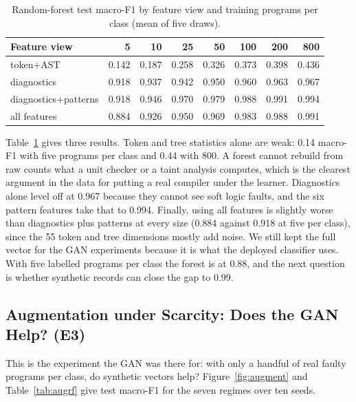 \documentclass[12pt,a4paper]{article}
\begin{document}
\begin{table}[!htbp]
\centering
\caption{Random-forest test macro-F1 by feature view and training programs per class (mean of five draws).}
\label{tab:learning}
\small
\begin{tabular}{lrrrrrrr}
\toprule
\textbf{Feature view} & \textbf{5} & \textbf{10} & \textbf{25} & \textbf{50} & \textbf{100} & \textbf{200} & \textbf{800}\\
\midrule
token+AST & 0.142 & 0.187 & 0.258 & 0.326 & 0.373 & 0.398 & 0.436\\
diagnostics & 0.918 & 0.937 & 0.942 & 0.950 & 0.960 & 0.963 & 0.967\\
diagnostics+patterns & 0.918 & 0.946 & 0.970 & 0.979 & 0.988 & 0.991 & 0.994\\
all features & 0.884 & 0.926 & 0.950 & 0.969 & 0.983 & 0.988 & 0.991\\\bottomrule
\end{tabular}

\end{table}

Table~\ref{tab:learning} gives three results. Token and tree statistics alone are weak: 0.14 macro-F1 with five programs
per class and 0.44 with 800. A forest cannot rebuild from raw counts what a unit checker or a taint analysis computes,
which is the clearest argument in the data for putting a real compiler under the learner. Diagnostics alone level off
at 0.967 because they cannot see soft logic faults, and the six pattern features take that to 0.994. Finally, using all
features is slightly worse than diagnostics plus patterns at every size (0.884 against 0.918 at five per class), since
the 55 token and tree dimensions mostly add noise. We still kept the full vector for the GAN experiments because it is
what the deployed classifier uses. With five labelled programs per class the forest is at 0.88, and the next question
is whether synthetic records can close the gap to 0.99.

\subsection{Augmentation under Scarcity: Does the GAN Help? (E3)}

This is the experiment the GAN was there for: with only a handful of real faulty programs per class, do synthetic
vectors help? Figure~\ref{fig:augment} and Table~\ref{tab:augrf} give test macro-F1 for the seven regimes over ten seeds.
\end{document}
